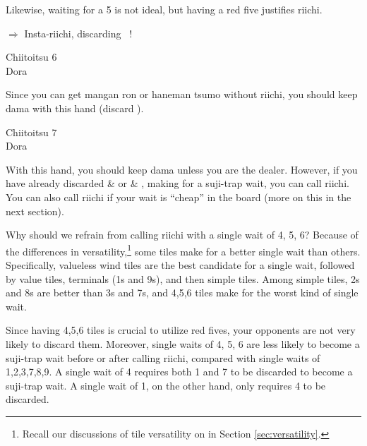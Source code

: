 \noindent Likewise, waiting for a 5 is not ideal, but having a red five justifies riichi. 

\begin{center}
{\Large $\Rightarrow$ Insta-riichi, discarding  ~!}
\end{center}

\bigskip
\begin{itembox}[r]{{\jap Chiitoitsu 6}}
\bp
{}\fa\fa\bai\bai~~\bei\\
\hfill\footnotesize{{\jap Dora}~~~~~~~}
\ep
\vspace{-15pt}
\end{itembox}

\noindent Since you can get {\jap mangan ron} or {\jap haneman tsumo} without riichi, you should keep {\jap dama} with this hand (discard {\LARGE {}}). 

\bigskip
\begin{itembox}[r]{{\jap Chiitoitsu 7}}
\bp
{}\fa\fa~~\bei\\
\hfill\footnotesize{{\jap Dora}~~~~~~~}
\ep
\vspace{-15pt}
\end{itembox}

\noindent With this hand, you should keep {\jap dama} unless you are the dealer. However, if you have already discarded {\LARGE{}} \& {\LARGE{}} or {\LARGE{}} \& {\LARGE{}}, making for a {\jap suji}-trap wait, you can call riichi. You can also call riichi if your wait is ``cheap'' in the board (more on this in the next section).

\bigskip
Why should we refrain from calling riichi with a single wait of 4, 5, 6?
Because of the differences in versatility,\footnote{Recall our discussions of tile versatility on in Section \ref{sec:versatility}.} some tiles make for a better single wait than others. 
Specifically, valueless wind tiles are the best candidate for a single wait, followed by value tiles, terminals (1s and 9s), and then simple tiles. Among simple tiles, 2s and 8s are better than 3s and 7s, and 4,5,6 tiles make for the worst kind of single wait. 

\bigskip
Since having 4,5,6 tiles is crucial to utilize red fives, your opponents are not very likely to discard them. Moreover, single waits of 4, 5, 6 are less likely to become a {\jap suji}-trap wait before or after calling riichi, compared with single waits of 1,2,3,7,8,9. 
A single wait of 4 requires both 1 and 7 to be discarded to become a {\jap suji}-trap wait. A single wait of 1, on the other hand, only requires 4 to be discarded. 

